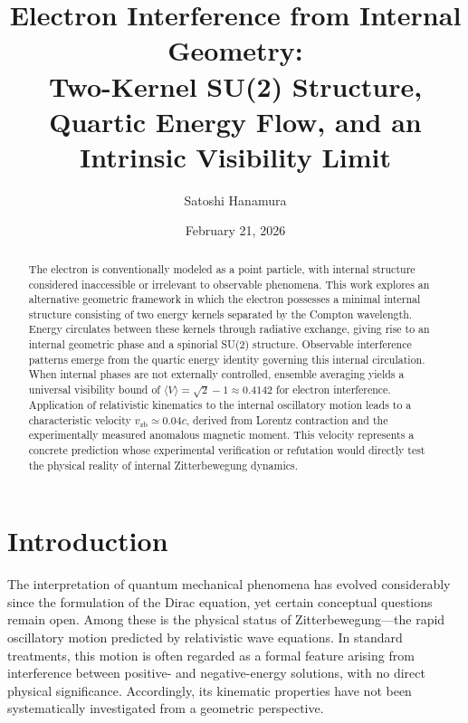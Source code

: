 \documentclass[%
 reprint,
 amsmath,amssymb,
 aps,
 prb,
]{revtex4-2}
\numberwithin{equation}{section}
\begin{document}
\title{Electron Interference from Internal Geometry: \\
Two-Kernel SU(2) Structure, Quartic Energy Flow, and an Intrinsic Visibility Limit}

\author{Satoshi Hanamura}
\date{February 21, 2026}


\begin{abstract}
The electron is conventionally modeled as a point particle, with internal structure considered inaccessible or irrelevant to observable phenomena. This work explores an alternative geometric framework in which the electron possesses a minimal internal structure consisting of two energy kernels separated by the Compton wavelength. Energy circulates between these kernels through radiative exchange, giving rise to an internal geometric phase and a spinorial SU(2) structure. Observable interference patterns emerge from the quartic energy identity governing this internal circulation. When internal phases are not externally controlled, ensemble averaging yields a universal visibility bound of $\langle V \rangle = \sqrt{2}-1 \approx 0.4142$ for electron interference. Application of relativistic kinematics to the internal oscillatory motion leads to a characteristic velocity $v_{\mathrm{zb}} \simeq 0.04c$, derived from Lorentz contraction and the experimentally measured anomalous magnetic moment. This velocity represents a concrete prediction whose experimental verification or refutation would directly test the physical reality of internal Zitterbewegung dynamics.
\end{abstract}

\maketitle


\section{Introduction}
\label{sec:introduction}

The interpretation of quantum mechanical phenomena has evolved considerably since the formulation of the Dirac equation, yet certain conceptual questions remain open. Among these is the physical status of Zitterbewegung---the rapid oscillatory motion predicted by relativistic wave equations. In standard treatments, this motion is often regarded as a formal feature arising from interference between positive- and negative-energy solutions, with no direct physical significance. Accordingly, its kinematic properties have not been systematically investigated from a geometric perspective.
\end{document}
